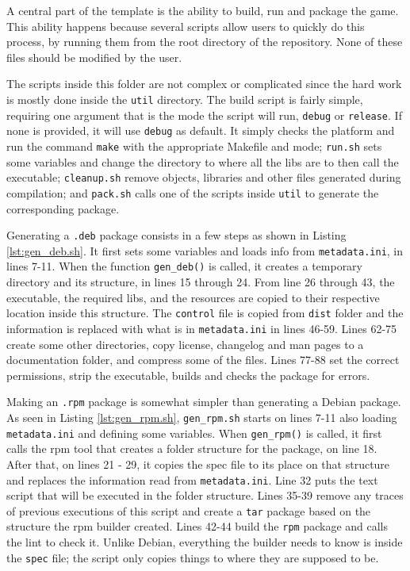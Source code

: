 A central part of the template is the ability to build, run and package the game. This ability happens because several scripts allow users to quickly do this process, by running them from the root directory of the repository. None of these files should be modified by the user.

The scripts inside this folder are not complex or complicated since the hard work is mostly done inside the \texttt{util} directory. The build script is fairly simple, requiring one argument that is the mode the script will run, \texttt{debug} or \texttt{release}. If none is provided, it will use \texttt{debug} as default. It simply checks the platform and run the command \texttt{make} with the appropriate Makefile and mode; \texttt{run.sh} sets some variables and change the directory to where all the libs are to then call the executable; \texttt{cleanup.sh} remove objects, libraries and other files generated during compilation; and \texttt{pack.sh} calls one of the scripts inside \texttt{util} to generate the corresponding package.

Generating a \texttt{.deb} package consists in a few steps as shown in Listing \ref{lst:gen_deb.sh}. It first sets some variables and loads info from \texttt{metadata.ini}, in lines 7-11. When the function \texttt{gen\_deb()} is called, it creates a temporary directory and its structure, in lines 15 through 24. From line 26 through 43, the executable, the required libs, and the resources are copied to their respective location inside this structure. The \texttt{control} file is copied from \texttt{dist} folder and the information is replaced with what is in \texttt{metadata.ini} in lines 46-59. Lines 62-75 create some other directories, copy license, changelog and man pages to a documentation folder, and compress some of the files. Lines 77-88 set the correct permissions, strip the executable, builds and checks the package for errors.



Making an \texttt{.rpm} package is somewhat simpler than generating a Debian package. As seen in Listing \ref{lst:gen_rpm.sh}, \texttt{gen\_rpm.sh} starts on lines 7-11 also loading \texttt{metadata.ini} and defining some variables. When \texttt{gen\_rpm()} is called, it first calls the rpm tool that creates a folder structure for the package, on line 18. After that, on lines 21 - 29, it copies the spec file to its place on that structure and replaces the information read from \texttt{metadata.ini}. Line 32 puts the text script that will be executed in the folder structure. Lines 35-39 remove any traces of previous executions of this script and create a \texttt{tar} package based on the structure the rpm builder created. Lines 42-44 build the \texttt{rpm} package and calls the lint to check it. Unlike Debian, everything the builder needs to know is inside the \texttt{spec} file; the script only copies things to where they are supposed to be.

